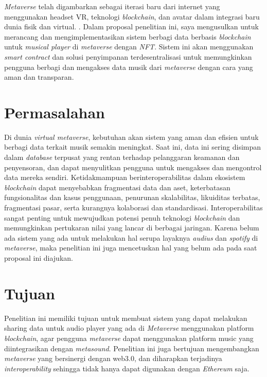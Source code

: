 \emph{Metaverse} telah digambarkan sebagai iterasi baru dari internet yang menggunakan headset VR, teknologi \emph{blockchain},
dan avatar dalam integrasi baru dunia fisik dan virtual. \parencite{DWIVEDI2022102542}. Dalam proposal penelitian ini, saya mengusulkan
untuk merancang dan mengimplementasikan sistem berbagi data berbasis \emph{blockchain}
untuk \emph{musical player} di \emph{metaverse} dengan \emph{NFT}. Sistem ini akan menggunakan \emph{smart contract} dan solusi penyimpanan terdesentralisasi
untuk memungkinkan pengguna berbagi dan mengakses data musik dari \emph{metaverse} dengan cara yang aman dan transparan.

\section{Permasalahan}
\label{sec:permasalahan}

Di dunia \emph{virtual metaverse}, kebutuhan akan sistem yang aman dan efisien untuk berbagi data terkait musik semakin meningkat.
Saat ini, data ini sering disimpan dalam \emph{database} terpusat yang rentan terhadap pelanggaran keamanan dan
penyensoran, dan dapat menyulitkan pengguna untuk mengakses dan mengontrol data mereka sendiri. Ketidakmampuan berinteroperabilitas 
dalam ekosistem \emph{blockchain} dapat menyebabkan fragmentasi data dan aset, keterbatasan fungsionalitas dan kasus penggunaan, penurunan skalabilitas, 
likuiditas terbatas, fragmentasi pasar, serta kurangnya kolaborasi dan standardisasi. Interoperabilitas sangat penting untuk mewujudkan potensi penuh teknologi 
\emph{blockchain} dan memungkinkan pertukaran nilai yang lancar di berbagai jaringan. Karena belum ada sistem yang ada untuk melakukan
hal serupa layaknya \emph{audius} dan \emph{spotify} di \emph{metaverse},
maka penelitian ini juga mencetuskan hal yang belum ada pada saat proposal ini diajukan.

\section{Tujuan}
\label{sec:Tujuan}

Penelitian ini memiliki tujuan untuk membuat sistem yang
dapat melakukan sharing data untuk audio player yang ada
di \emph{Metaverse} menggunakan platform \emph{blockchain}, agar
pengguna \emph{metaverse} dapat menggunakan platform music
yang diintegrasikan dengan \emph{metasound}. Penelitian ini juga bertujuan mengembangkan \emph{metaverse} yang
bersinergi dengan web3.0, dan diharapkan terjadinya \emph{interoperability} sehingga tidak hanya dapat digunakan
dengan \emph{Ethereum} saja.

